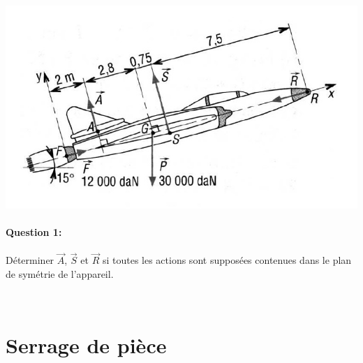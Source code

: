\begin{center}
 \includegraphics[width=0.9\linewidth]{img/avion_schem.jpg}
\end{center}

\paragraph{Question 1:} Déterminer $\overrightarrow{A}$, $\overrightarrow{S}$ et $\overrightarrow{R}$ si toutes les actions sont supposées contenues dans le plan de symétrie de l'appareil.


\newpage

~\

\newpage

\section{Serrage de pièce}


